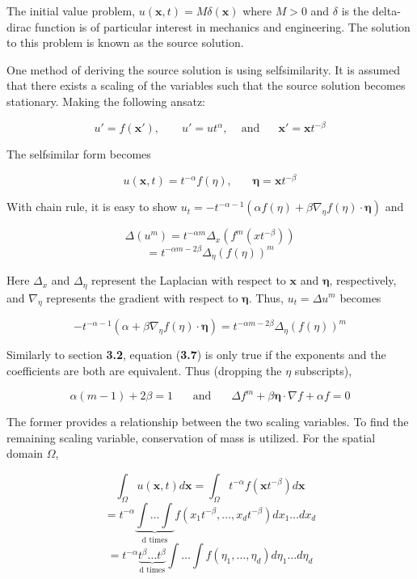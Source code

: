 \documentclass[paper=a4, fontsize=12pt]{scrartcl} %
\numberwithin{equation}{section} %
\numberwithin{table}{section} %
\begin{document}
The initial value problem, $u( \mathbf{x}, t) = M \delta (\mathbf{x})$ where $M >0$ and $\delta$ is the delta-dirac function is of particular interest in mechanics and engineering. The solution to this problem is known as the source solution. 

One method of deriving the source solution  is using selfsimilarity. It is assumed that there exists a scaling of the variables such that the source solution becomes stationary. Making the following ansatz: 

$$u' = f(\mathbf{x}')\text{,      }~~~~~~~~ u'=ut^\alpha\text{,}~~~~~~\text{and }~~~~~~\mathbf{x}'=\mathbf{x}t^{-\beta}$$

The selfsimilar form becomes

\begin{equation}
    u(\mathbf{x},t) = t^{-\alpha}f(\eta), ~~~~~~~~ \mathbf{\eta} = \mathbf{x}t^{-\beta}
\end{equation}

With chain rule, it is easy to show $u_t = -t^{-\alpha - 1} (\alpha f(\eta)+ \beta \nabla_\eta f(\eta) \cdot \mathbf{\eta})$ and 

$$\Delta (u^m)=t^{-\alpha m} \Delta_x(f^m (xt^{-\beta}))$$
$$= t^{-\alpha m - 2 \beta} \Delta_\eta (f(\eta))^m$$

Here $\Delta_x$ and $\Delta_\eta$ represent the Laplacian with respect to $\mathbf{x}$ and $\mathbf{\eta}$, respectively, and $\nabla _\eta$ represents the gradient with respect to $\mathbf{\eta}$. Thus, $u_t = \Delta u^m$ becomes

\begin{equation}
    -t^{-\alpha - 1} (\alpha + \beta \nabla_\eta f(\eta) \cdot \mathbf{\eta}) = t^{-\alpha m - 2 \beta} \Delta_\eta (f(\eta))^m
\end{equation}

Similarly to section \textbf{3.2}, equation (\textbf{3.7}) is only true if the exponents and the coefficients are both are equivalent. Thus (dropping the $\eta$ subscripts), 

\begin{equation}
    \alpha (m-1) + 2 \beta =1 ~~~~~~~~ \text{and} ~~~~~~~~ \Delta f^m + \beta \mathbf{\eta} \cdot \nabla f + \alpha f = 0
\end{equation}

The former provides a relationship between the two scaling variables. To find the remaining scaling variable, conservation of mass is utilized. For the spatial domain $\Omega$,

$$\int_{\Omega} u(\mathbf{x},t) d \mathbf{x}=\int_{\Omega} t^{-\alpha} f(\mathbf{x}t^{-\beta}) d \mathbf{x}$$
$$= t^{-\alpha}\underbrace{\int  \dots \int }_{\text{d times}} f(x_1 t^{-\beta}, \dots,x_d t^{-\beta})d x_1 \dots d x_d$$
$$=t^{-\alpha} \underbrace{t^\beta \dots t^\beta}_{\text{d times}} \int \dots \int f(\eta_1, \dots, \eta_d) d\eta_1 \dots d \eta_d$$
\end{document}
